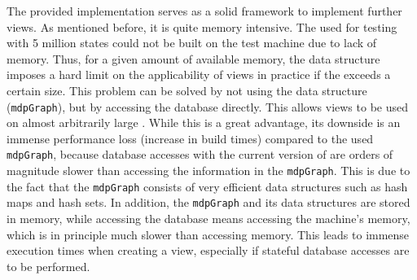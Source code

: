\documentclass[preview]{standalone}
\begin{document}
The provided implementation serves as a solid framework to implement further views. As mentioned before, it is quite memory intensive. The \mdpN used for testing with 5 million states could not be built on the test machine due to lack of memory. Thus, for a given amount of available memory, the data structure imposes a hard limit on the applicability of views in practice if the \mdpN exceeds a certain size. This problem can be solved by not using the data structure (\texttt{mdpGraph}), but by accessing the database directly. This allows views to be used on almost arbitrarily large \mdpsN. While this is a great advantage, its downside is an immense performance loss (increase in build times) compared to the used \texttt{mdpGraph}, because database accesses with the current version of \pmcvis are orders of magnitude slower than accessing the information in the \texttt{mdpGraph}. This is due to the fact that the \texttt{mdpGraph} consists of very efficient data structures such as hash maps and hash sets. In addition, the \texttt{mdpGraph} and its data structures are stored in memory, while accessing the database means accessing the machine's memory, which is in principle much slower than accessing memory. This leads to immense execution times when creating a view, especially if stateful database accesses are to be performed.
\end{document}

